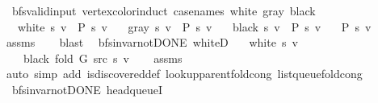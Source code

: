 \begin{isabellebody}
\begin{isamarkuptext}
\end{isamarkuptext}\isamarkuptrue%
\isamarkupfalse%
\ {\isacharparenleft}{\kern0pt}\ bfs{\isacharunderscore}{\kern0pt}valid{\isacharunderscore}{\kern0pt}input{\isacharparenright}{\kern0pt}\ vertex{\isacharunderscore}{\kern0pt}color{\isacharunderscore}{\kern0pt}induct\ {\isacharbrackleft}{\kern0pt}case{\isacharunderscore}{\kern0pt}names\ white\ gray\ black{\isacharbrackright}{\kern0pt}{\isacharcolon}{\kern0pt}\isanewline
\ \ \ {\isachardoublequoteopen}white\ s\ v\ {\isasymLongrightarrow}\ P\ s\ v{\isachardoublequoteclose}\isanewline
\ \ \ {\isachardoublequoteopen}gray\ s\ v\ {\isasymLongrightarrow}\ P\ s\ v{\isachardoublequoteclose}\isanewline
\ \ \ {\isachardoublequoteopen}black\ s\ v\ {\isasymLongrightarrow}\ P\ s\ v{\isachardoublequoteclose}\isanewline
\ \ \ {\isachardoublequoteopen}P\ s\ v{\isachardoublequoteclose}\isanewline
%
\isadelimproof
\ \ %
\endisadelimproof
%
\isatagproof
{}\isamarkupfalse%
\ assms\isanewline
\ \ \isamarkupfalse%
\ blast%
\endisatagproof
{\isafoldproof}%
%
\isadelimproof
\isanewline
%
\endisadelimproof
\isanewline
{}\isamarkupfalse%
\ {\isacharparenleft}{\kern0pt}\ bfs{\isacharunderscore}{\kern0pt}invar{\isacharunderscore}{\kern0pt}not{\isacharunderscore}{\kern0pt}DONE{\isacharparenright}{\kern0pt}\ whiteD{\isacharcolon}{\kern0pt}\isanewline
\ \ \ {\isachardoublequoteopen}white\ s\ v{\isachardoublequoteclose}\isanewline
\ \ \ {\isachardoublequoteopen}{\isasymnot}\ black\ {\isacharparenleft}{\kern0pt}fold\ G\ src\ s{\isacharparenright}{\kern0pt}\ v{\isachardoublequoteclose}\isanewline
%
\isadelimproof
\ \ %
\endisadelimproof
%
\isatagproof
{}\isamarkupfalse%
\ assms\isanewline
\ \ \isamarkupfalse%
\ {\isacharparenleft}{\kern0pt}auto\ simp\ add{\isacharcolon}{\kern0pt}\ is{\isacharunderscore}{\kern0pt}discovered{\isacharunderscore}{\kern0pt}def\ lookup{\isacharunderscore}{\kern0pt}parent{\isacharunderscore}{\kern0pt}fold{\isacharunderscore}{\kern0pt}cong\ list{\isacharunderscore}{\kern0pt}queue{\isacharunderscore}{\kern0pt}fold{\isacharunderscore}{\kern0pt}cong{\isacharparenright}{\kern0pt}%
\endisatagproof
{\isafoldproof}%
%
\isadelimproof
\isanewline
%
\endisadelimproof
\isanewline
{}\isamarkupfalse%
\ {\isacharparenleft}{\kern0pt}\ bfs{\isacharunderscore}{\kern0pt}invar{\isacharunderscore}{\kern0pt}not{\isacharunderscore}{\kern0pt}DONE{\isacharparenright}{\kern0pt}\ head{\isacharunderscore}{\kern0pt}queueI{\isacharunderscore}{\kern0pt}{}{\isacharcolon}{\kern0pt}\isanewline

\end{isabellebody}
